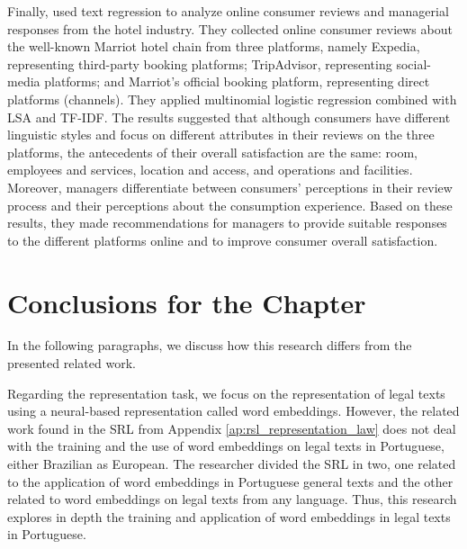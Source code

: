 Finally, \textcite{XU2020} used text regression to analyze online consumer reviews and managerial responses from the hotel industry. They collected online consumer reviews about the well-known Marriot hotel chain from three platforms, namely Expedia, representing third-party booking platforms; TripAdvisor, representing social-media platforms; and Marriot's official booking platform, representing direct platforms (channels). They applied multinomial logistic regression combined with \gls{LSA} and \gls{TF-IDF}. The results suggested that although consumers have different linguistic styles and focus on different attributes in their reviews on the three platforms, the antecedents of their overall satisfaction are the same: room, employees and services, location and access, and operations and facilities. Moreover, managers differentiate between consumers' perceptions in their review process and their perceptions about the consumption experience. Based on these results, they made recommendations for managers to provide suitable responses to the different platforms online and to improve consumer overall satisfaction.



\section{Conclusions for the Chapter}

In the following paragraphs, we discuss how this research differs from the presented related work.


Regarding the representation task, we focus on the representation of legal texts using a neural-based representation called word embeddings. However, the related work found in the \gls{SRL} from Appendix \ref{ap:rsl_representation_law} does not deal with the training and the use of word embeddings on legal texts in Portuguese, either Brazilian as European. The researcher divided the \gls{SRL} in two, one related to the application of word embeddings in Portuguese general texts and the other related to word embeddings on legal texts from any language. Thus, this research explores in depth the training and application of word embeddings in legal texts in Portuguese.

